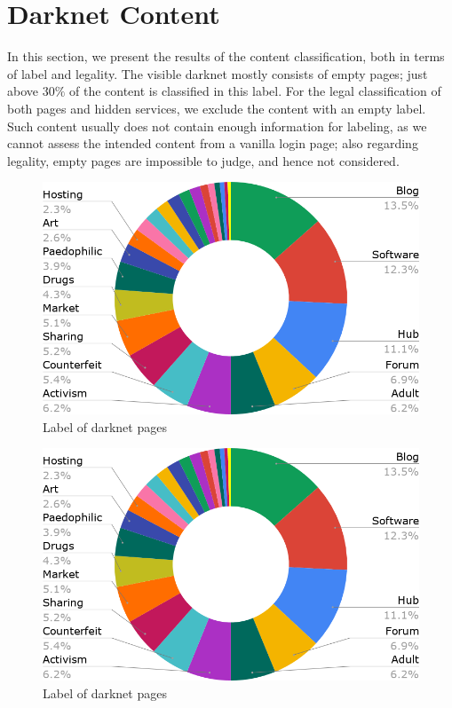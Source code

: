 \section{Darknet Content}
\label{sec:results}

In this section, we present the results of the content classification, both in terms of label and legality. 
The visible darknet mostly consists of empty pages; just above $30\%$ of the content is classified in this label. 
For the legal classification of both pages and hidden services, we exclude the content with an empty label. Such content usually does not contain enough information for labeling, as we cannot assess the intended content from a vanilla login page; also regarding legality, empty pages are impossible to judge, and hence not considered.
\ifdgruyter
  \begin{figure}[h]
  \includegraphics[width=\linewidth]{images/labelsByContent.png}
  \caption{Label of darknet pages}
  \label{fig:labelsByContent}
  \end{figure}
\fi

\iflncs
  \begin{figure}[h]
  \centering
  \includegraphics[width=0.6\linewidth]{images/labelsByContent.png}
  \caption{Label of darknet pages}
  \label{fig:labelsByContent}
  \end{figure}
\fi

